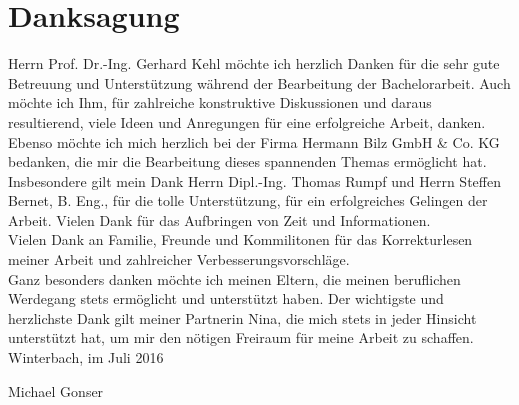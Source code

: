 
\chapter*{Danksagung}

Herrn Prof. Dr.-Ing. Gerhard Kehl möchte ich herzlich Danken für die sehr gute Betreuung und Unterstützung während der Bearbeitung der Bachelorarbeit. Auch möchte ich Ihm, für zahlreiche konstruktive Diskussionen und daraus resultierend, viele Ideen und Anregungen für eine erfolgreiche Arbeit, danken. \\

Ebenso möchte ich mich herzlich bei der Firma Hermann Bilz GmbH \& Co. KG bedanken, die mir die Bearbeitung dieses spannenden Themas ermöglicht hat. Insbesondere gilt mein Dank Herrn Dipl.-Ing. Thomas Rumpf und Herrn Steffen Bernet, B. Eng.,  für die tolle Unterstützung, für ein erfolgreiches Gelingen der Arbeit. Vielen Dank für das Aufbringen von Zeit und Informationen. \\

Vielen Dank an Familie, Freunde und Kommilitonen für das Korrekturlesen meiner Arbeit und zahlreicher Verbesserungsvorschläge. \\

Ganz besonders danken möchte ich meinen Eltern, die meinen beruflichen Werdegang stets ermöglicht und unterstützt haben. Der wichtigste und herzlichste Dank gilt meiner Partnerin Nina, die mich stets in jeder Hinsicht unterstützt hat, um mir den nötigen Freiraum für meine Arbeit zu schaffen. \\

Winterbach, im Juli 2016\\
\vspace{2cm}

Michael Gonser